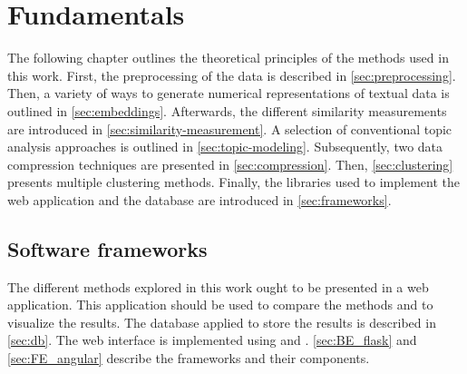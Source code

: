 \chapter{Fundamentals}\label{ch:methodology} %

The following chapter outlines the theoretical principles of the methods used in this work.
First, the preprocessing of the data is described in \autoref{sec:preprocessing}.
Then, a variety of ways to generate numerical representations of textual data is outlined in \autoref{sec:embeddings}.
Afterwards, the different similarity measurements are introduced in \autoref{sec:similarity-measurement}.
A selection of conventional topic analysis approaches is outlined in \autoref{sec:topic-modeling}.
Subsequently, two data compression techniques are presented in \autoref{sec:compression}.
Then, \autoref{sec:clustering} presents multiple clustering methods.
Finally, the libraries used to implement the web application and the database are introduced in \autoref{sec:frameworks}.




















\section{Software frameworks}\label{sec:frameworks}

The different methods explored in this work ought to be presented in a web application.
This application should be used to compare the methods and to visualize the results.
The database applied to store the results is described in \autoref{sec:db}.
The web interface is implemented using \flask{} and \angular{}.
\autoref{sec:BE_flask} and \autoref{sec:FE_angular} describe the frameworks and their components.





